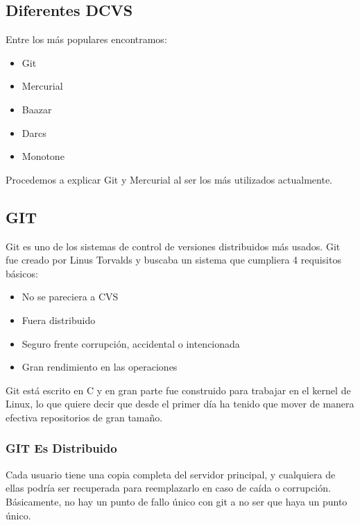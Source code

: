\subsection{Diferentes DCVS}
Entre los más populares encontramos:
\begin{itemize}
\item Git
\item Mercurial
\item Baazar
\item Darcs
\item Monotone
\end{itemize}
Procedemos a explicar Git y Mercurial al ser los más utilizados actualmente. 


\subsection{GIT}
Git es uno de los sistemas de control de versiones distribuidos más usados. Git fue creado por Linus Torvalds y buscaba un sistema que cumpliera
4 requisitos básicos:
\begin{itemize}
\item No se pareciera a CVS
\item Fuera distribuido
\item Seguro frente corrupción, accidental o intencionada
\item Gran rendimiento en las operaciones
\end{itemize} 
Git está escrito en C y en gran parte fue construido para trabajar en el kernel de Linux, lo que quiere decir que desde el primer día ha tenido que mover 
de manera efectiva repositorios de gran tamaño. 

\subsubsection{GIT Es Distribuido}
Cada usuario tiene una copia completa del servidor principal, y cualquiera de ellas podría ser recuperada para reemplazarlo en caso 
de caída o corrupción. Básicamente, no hay un punto de fallo único con git a no ser que haya un punto único. 
